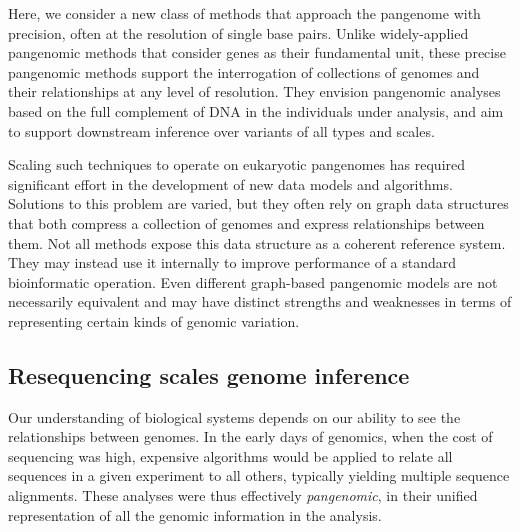 Here, we consider a new class of methods that approach the pangenome with precision, often at the resolution of single base pairs.
Unlike widely-applied pangenomic methods that consider genes as their fundamental unit, these precise pangenomic methods support the interrogation of collections of genomes and their relationships at any level of resolution.
They envision pangenomic analyses based on the full complement of DNA in the individuals under analysis, and aim to support downstream inference over variants of all types and scales.

Scaling such techniques to operate on eukaryotic pangenomes has required significant effort in the development of new data models and algorithms.
Solutions to this problem are varied, but they often rely on graph data structures that both compress a collection of genomes and express relationships between them.
Not all methods expose this data structure as a coherent reference system.
They may instead use it internally to improve performance of a standard bioinformatic operation.
Even different graph-based pangenomic models are not necessarily equivalent and may have distinct strengths and weaknesses in terms of representing certain kinds of genomic variation.


\subsection{Resequencing scales genome inference}

Our understanding of biological systems depends on our ability to see the relationships between genomes.
In the early days of genomics, when the cost of sequencing was high, expensive algorithms would be applied to relate all sequences in a given experiment to all others, typically yielding multiple sequence alignments.
These analyses were thus effectively \emph{pangenomic}, in their unified representation of all the genomic information in the analysis.

